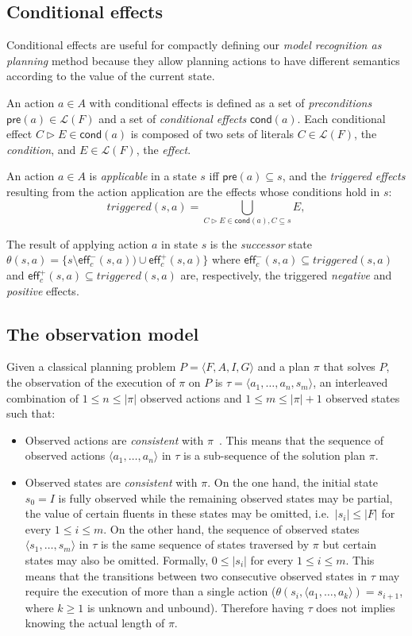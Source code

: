 \documentclass[letterpaper]{article} %
\newcommand{\tup}[1]{{\langle #1 \rangle}}
\newcommand{\pre}{\mathsf{pre}}     %
\newcommand{\eff}{\mathsf{eff}}     %
\newcommand{\cond}{\mathsf{cond}}   %
\begin{document}
\subsection{Conditional effects}
Conditional effects are useful for compactly defining our {\em model recognition as planning} method because they allow planning actions to have different semantics according to the value of the current state. 

An action $a\in A$ with conditional effects is defined as a set of {\em preconditions} $\pre(a)\in\mathcal{L}(F)$ and a set of {\em conditional effects} $\cond(a)$. Each conditional effect $C\rhd E\in\cond(a)$ is composed of two sets of literals $C\in\mathcal{L}(F)$, the {\em condition}, and $E\in\mathcal{L}(F)$, the {\em effect}.

An action $a\in A$ is {\em applicable} in a state $s$ iff $\pre(a)\subseteq s$, and the {\em triggered effects} resulting from the action application are the effects whose conditions hold in $s$:
\[
triggered(s,a)=\bigcup_{C\rhd E\in\cond(a),C\subseteq s} E,
\]

The result of applying action $a$ in state $s$ is the {\em successor} state $\theta(s,a)=\{s\setminus\eff_c^-(s,a))\cup\eff_c^+(s,a)\}$ where $\eff_c^-(s,a)\subseteq triggered(s,a)$ and $\eff_c^+(s,a)\subseteq triggered(s,a)$ are, respectively, the triggered {\em negative} and {\em positive} effects.

\subsection{The observation model}
Given a classical planning problem $P=\tup{F,A,I,G}$ and a plan $\pi$ that solves $P$, the observation of the execution of  $\pi$ on $P$ is $\tau=\tup{a_1, \ldots , a_n, s_m}$, an interleaved combination of {\small $1\leq n\leq |\pi|$} observed actions and {\small $1\leq m\leq |\pi|+1$} observed states such that:
\begin{itemize}
\item Observed actions are {\em consistent} with $\pi$~\cite{ramirez2009plan}. This means that the sequence of observed actions $\tup{a_1, \ldots, a_n}$ in $\tau$ is a sub-sequence of the solution plan $\pi$.
\item Observed states  are {\em consistent} with $\pi$. On the one hand, the initial state $s_0=I$ is fully observed while the remaining observed states may be partial, the value of certain fluents in these states may be omitted, i.e.~$|s_i|\leq |F|$ for every $1\leq i\leq m$. On the other hand, the sequence of observed states $\tup{s_1, \ldots, s_m}$ in $\tau$ is the same sequence of states traversed by $\pi$ but certain states may also be omitted. Formally, $0\leq|s_i|$ for every $1\leq i\leq m$. This means that the transitions between two consecutive observed states in $\tau$ may require the execution of more than a single action ($\theta(s_i,\tup{a_1,\ldots,a_k})=s_{i+1}$, where $k\geq 1$ is unknown and unbound). Therefore having $\tau$ does not implies knowing the actual length of $\pi$.

\end{itemize}
\end{document}
